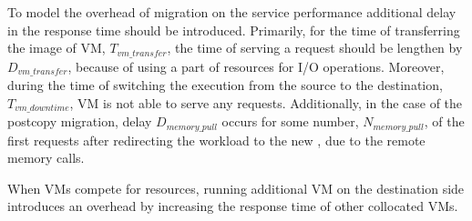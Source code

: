 
To model the overhead of migration on the service performance additional delay in the response time should be introduced.
Primarily, for the time of transferring the image of VM, $T_{vm\_transfer}$, the time of serving a request should be lengthen by $D_{vm\_transfer}$, because of using a part of resources for I/O operations.
Moreover, during the time of switching the execution from the source to the destination, $T_{vm\_downtime}$, VM is not able to serve any requests.
Additionally, in the case of the postcopy migration, delay  $D_{memory\_pull}$ occurs for some number, $N_{memory\_pull}$, of the first requests after redirecting the workload to the new \dc{}, due to the remote memory calls.

When VMs compete for resources, running additional VM on the destination side introduces an overhead by increasing the response time of other collocated VMs.